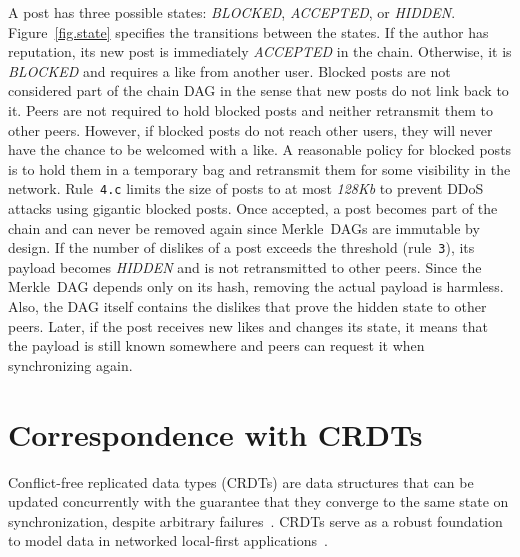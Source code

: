 \documentclass[10pt,journal,compsoc]{IEEEtran}
\begin{document}
A post has three possible states: \emph{BLOCKED}, \emph{ACCEPTED}, or
\emph{HIDDEN}.
Figure~\ref{fig.state} specifies the transitions between the states.
%
If the author has reputation, its new post is immediately \emph{ACCEPTED} in
the chain.
Otherwise, it is \emph{BLOCKED} and requires a like from another user.
Blocked posts are not considered part of the chain DAG in the sense that new
posts do not link back to it.
%
Peers are not required to hold blocked posts and neither retransmit them to
other peers.
However, if blocked posts do not reach other users, they will never have the
chance to be welcomed with a like.
A reasonable policy for blocked posts is to hold them in a temporary bag and
retransmit them for some visibility in the network.
Rule~\texttt{4.c} limits the size of posts to at most \emph{128Kb} to prevent
DDoS attacks using gigantic blocked posts.
%
Once accepted, a post becomes part of the chain and can never be removed
again since Merkle~DAGs are immutable by design.
%
If the number of dislikes of a post exceeds the threshold (rule~\texttt{3}),
its payload becomes \emph{HIDDEN} and is not retransmitted to other peers.
Since the Merkle~DAG depends only on its hash, removing the actual payload is
harmless.
Also, the DAG itself contains the dislikes that prove the hidden state to other
peers.
Later, if the post receives new likes and changes its state, it means that the
payload is still known somewhere and peers can request it when synchronizing
again.

\section{Correspondence with CRDTs}
\label{sec.crdts}

Conflict-free replicated data types (CRDTs) are data structures that can be
updated concurrently with the guarantee that they converge to the same state on
synchronization, despite arbitrary failures~\cite{p2p.crdts}.
%
CRDTs serve as a robust foundation to model data in networked local-first
applications~\cite{p2p.local}.
\end{document}
